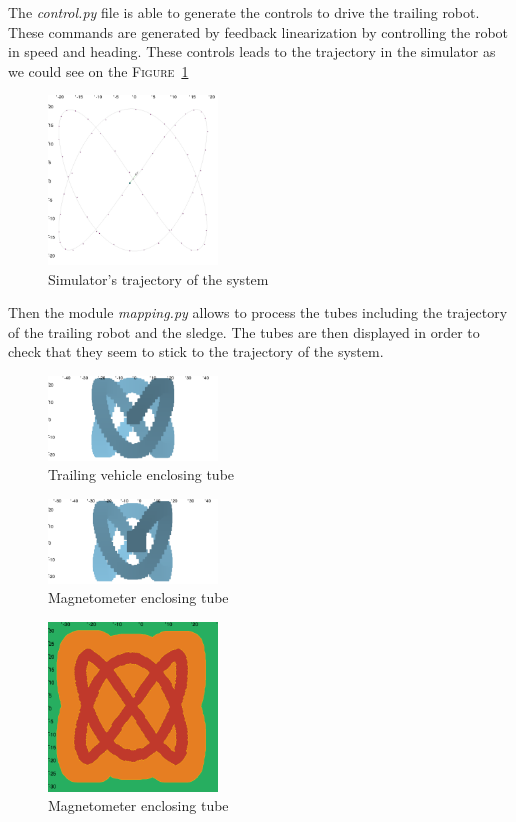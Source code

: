     The \textit{control.py} file is able to generate the controls to drive the trailing robot. These commands are generated by feedback linearization by controlling the robot in speed and heading. These controls leads to the trajectory in the simulator  as we could see on the \textsc{Figure}~\ref{fig:simulator_lissajous}

    \begin{figure}
        \centering
        \includegraphics[width=0.4\textwidth]{imgs/simulator_lissajous.png}
        \caption{Simulator's trajectory of the system}
        \label{fig:simulator_lissajous}
    \end{figure}

    Then the module \textit{mapping.py} allows to process the tubes including the trajectory of the trailing robot and the sledge. The tubes are then displayed in order to check that they seem to stick to the trajectory of the system.

    \begin{figure}[!htb]
        \centering
        \includegraphics[width=0.4\textwidth]{imgs/saturne_lissajous.png}
        \caption{Trailing vehicle enclosing tube}
        \label{fig:saturne_lissajous}
    \end{figure}

    \begin{figure}[!htb]
        \centering
        \includegraphics[width=0.4\textwidth]{imgs/magnetometer_lissajous.png}
        \caption{Magnetometer enclosing tube}
        \label{fig:magnetometer_lissajous}
    \end{figure}

    \begin{figure}[!htb]
        \centering
        \includegraphics[width=0.4\textwidth]{imgs/mapping_lissajous.png}
        \caption{Magnetometer enclosing tube}
        \label{fig:mapping_lissajous}
    \end{figure}